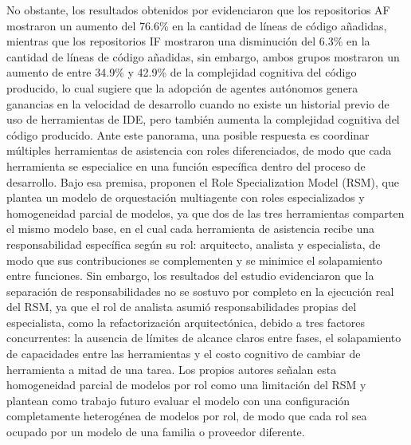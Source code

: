 No obstante, los resultados obtenidos por \textcite{agarwal2026codingagents} evidenciaron que los repositorios AF mostraron un aumento del 76.6\% en la cantidad de líneas de código añadidas, mientras que los repositorios IF mostraron una disminución del 6.3\% en la cantidad de líneas de código añadidas, sin embargo, ambos grupos mostraron un aumento de entre 34.9\% y 42.9\% de la complejidad cognitiva del código producido, lo cual sugiere que la adopción de agentes autónomos genera ganancias en la velocidad de desarrollo cuando no existe un historial previo de uso de herramientas de IDE, pero también aumenta la complejidad cognitiva del código producido.
Ante este panorama, una posible respuesta es coordinar múltiples herramientas de asistencia con roles diferenciados, de modo que cada herramienta se especialice en una función específica dentro del proceso de desarrollo. Bajo esa premisa, \textcite{fernandezyfernandez2026rsm} proponen el Role Specialization Model (RSM), que plantea un modelo de orquestación multiagente con roles especializados y homogeneidad parcial de modelos, ya que dos de las tres herramientas comparten el mismo modelo base, en el cual cada herramienta de asistencia recibe una responsabilidad específica según su rol: arquitecto, analista y especialista, de modo que sus contribuciones se complementen y se minimice el solapamiento entre funciones. Sin embargo, los resultados del estudio evidenciaron que la separación de responsabilidades no se sostuvo por completo en la ejecución real del RSM, ya que el rol de analista asumió responsabilidades propias del especialista, como la refactorización arquitectónica, debido a tres factores concurrentes: la ausencia de límites de alcance claros entre fases, el solapamiento de capacidades entre las herramientas y el costo cognitivo de cambiar de herramienta a mitad de una tarea. Los propios autores señalan esta homogeneidad parcial de modelos por rol como una limitación del RSM y plantean como trabajo futuro evaluar el modelo con una configuración completamente heterogénea de modelos por rol, de modo que cada rol sea ocupado por un modelo de una familia o proveedor diferente.
